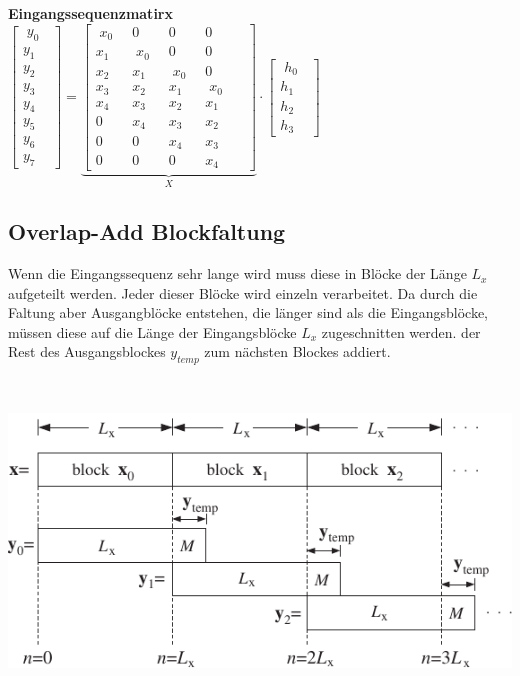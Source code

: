 		\begin{minipage}{0.5\textwidth}
			\textbf{Eingangssequenzmatirx  }\\[0.2cm]
			$\begin{bmatrix} \;y_0\;\;\\y_1\\y_2\\y_3\\y_4\\y_5\\y_6\\y_7\end{bmatrix} = \underbrace{\begin{bmatrix} \;x_0\;\; & 0 & 0 & 0\\ x_1&\;x_0\;\;&0&0\\x_2&x_1&\;x_0\;\;&0\\x_3&x_2&x_1&\;x_0\;\;\\x_4&x_3&x_2&x_1&\\0&x_4&x_3&x_2\\0&0&x_4&x_3&\\0&0&0&x_4&\end{bmatrix}}_{X}\cdot \begin{bmatrix} \;h_0\;\;\\h_1\\h_2\\h_3\end{bmatrix}$
		\end{minipage}
	
\newpage
	\subsection{Overlap-Add Blockfaltung}
		\vspace*{-0.2cm}\begin{minipage}{0.4\textwidth}
			Wenn die Eingangssequenz sehr lange wird muss diese in Blöcke der Länge $L_x$ aufgeteilt werden. Jeder dieser Blöcke wird einzeln verarbeitet. Da durch die Faltung aber Ausgangblöcke entstehen, die länger sind als die Eingangsblöcke, müssen diese auf die Länge der Eingangsblöcke $L_x$ zugeschnitten werden. der Rest des Ausgangsblockes $y_{temp}$ zum nächsten Blockes addiert.
		\end{minipage}
		\begin{minipage}{0.03\textwidth}$ $\end{minipage}
		\begin{minipage}{0.55\textwidth}
			\includegraphics[width = 1\textwidth]{pic/overlapConv.pdf}
		\end{minipage}

